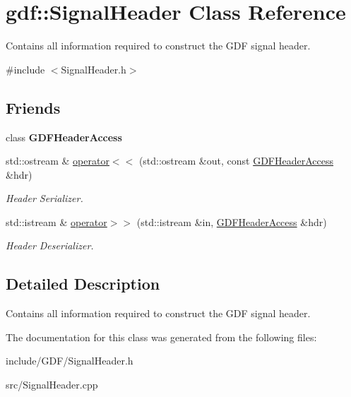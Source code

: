 \hypertarget{classgdf_1_1_signal_header}{
\section{gdf::SignalHeader Class Reference}
\label{classgdf_1_1_signal_header}
}


Contains all information required to construct the GDF signal header.  




{\ttfamily \#include $<$SignalHeader.h$>$}

\subsection*{Friends}
\begin{DoxyCompactItemize}
\item 
\hypertarget{classgdf_1_1_signal_header_ade47bf1d3f5a91747dd7fbb489fbcab0}{
class {\bfseries GDFHeaderAccess}}
\label{classgdf_1_1_signal_header_ade47bf1d3f5a91747dd7fbb489fbcab0}

\item 
\hypertarget{classgdf_1_1_signal_header_a0dd6213f6ada6c22b9c2e8e7890305a2}{
std::ostream \& \hyperlink{classgdf_1_1_signal_header_a0dd6213f6ada6c22b9c2e8e7890305a2}{operator$<$$<$} (std::ostream \&out, const \hyperlink{classgdf_1_1_g_d_f_header_access}{GDFHeaderAccess} \&hdr)}
\label{classgdf_1_1_signal_header_a0dd6213f6ada6c22b9c2e8e7890305a2}

\begin{DoxyCompactList}\small\item\em Header Serializer. \item\end{DoxyCompactList}\item 
\hypertarget{classgdf_1_1_signal_header_a0a4dea8648fdd7b1131f900f772d2961}{
std::istream \& \hyperlink{classgdf_1_1_signal_header_a0a4dea8648fdd7b1131f900f772d2961}{operator$>$$>$} (std::istream \&in, \hyperlink{classgdf_1_1_g_d_f_header_access}{GDFHeaderAccess} \&hdr)}
\label{classgdf_1_1_signal_header_a0a4dea8648fdd7b1131f900f772d2961}

\begin{DoxyCompactList}\small\item\em Header Deserializer. \item\end{DoxyCompactList}\end{DoxyCompactItemize}


\subsection{Detailed Description}
Contains all information required to construct the GDF signal header. 

The documentation for this class was generated from the following files:\begin{DoxyCompactItemize}
\item 
include/GDF/SignalHeader.h\item 
src/SignalHeader.cpp\end{DoxyCompactItemize}
